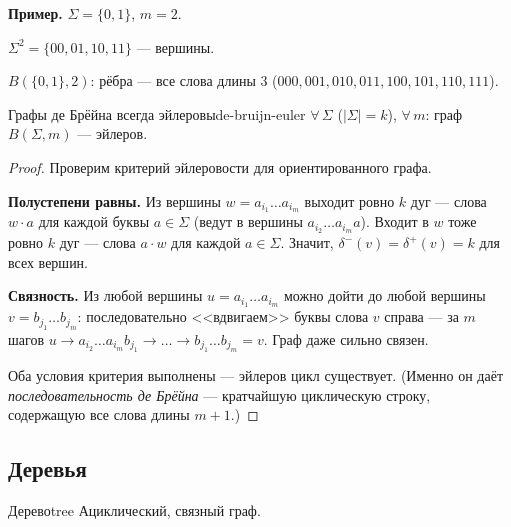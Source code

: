 \medskip
\noindent\textbf{Пример.}
$\Sigma = \{0, 1\}$, $m = 2$.


$\Sigma^2 = \{00, 01, 10, 11\}$ --- вершины.

$B(\{0,1\}, 2)$: рёбра --- все слова длины 3 ($000, 001, 010, 011, 100, 101, 110, 111$).

\medskip
\begin{statement}{Графы де Брёйна всегда эйлеровы}{de-bruijn-euler}
$\forall\, \Sigma$ ($|\Sigma| = k$), $\forall\, m$: граф $B(\Sigma, m)$ ---
эйлеров.
\end{statement}

\begin{proof}
Проверим критерий эйлеровости для ориентированного графа.

\textbf{Полустепени равны.} Из вершины $w = a_{i_1} \ldots a_{i_m}$ выходит
ровно $k$ дуг --- слова $w \cdot a$ для каждой буквы $a \in \Sigma$
(ведут в вершины $a_{i_2} \ldots a_{i_m} a$). Входит в $w$ тоже ровно $k$
дуг --- слова $a \cdot w$ для каждой $a \in \Sigma$. Значит,
$\delta^-(v) = \delta^+(v) = k$ для всех вершин.

\textbf{Связность.} Из любой вершины $u = a_{i_1} \ldots a_{i_m}$ можно
дойти до любой вершины $v = b_{j_1} \ldots b_{j_m}$: последовательно
<<вдвигаем>> буквы слова $v$ справа --- за $m$ шагов
$u \to a_{i_2} \ldots a_{i_m} b_{j_1} \to \ldots \to b_{j_1} \ldots b_{j_m} = v$.
Граф даже сильно связен.

Оба условия критерия выполнены --- эйлеров цикл существует. (Именно он
даёт \emph{последовательность де Брёйна} --- кратчайшую циклическую
строку, содержащую все слова длины $m + 1$.)
\end{proof}


\subsection*{Деревья}

\begin{defn}{Дерево}{tree}
Ациклический, связный граф.
\end{defn}

